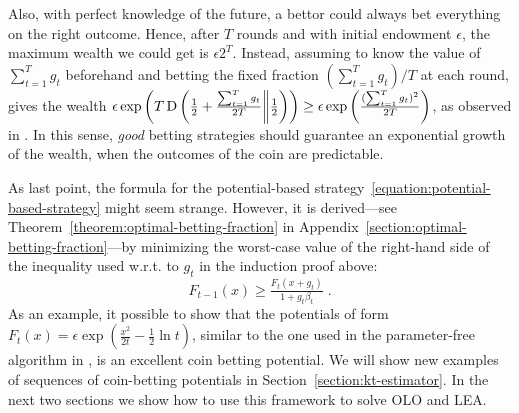 Also, with perfect knowledge of the future, a bettor could always bet everything on the right outcome. Hence, after $T$ rounds and with initial endowment $\epsilon$, the maximum wealth we could get is $\epsilon 2^T$. 
Instead, assuming to know the value of $\sum_{t=1}^T g_t$ beforehand and betting the fixed fraction $(\sum_{t=1}^T g_t)/T$ at each round, gives the wealth 
$\epsilon \exp\left(T \operatorname*{D}\left({\tfrac{1}{2}+\tfrac{\sum_{t=1}^T g_t}{2 T}}\middle\|{\tfrac{1}{2}}\right)\right) \geq \epsilon \exp\left(\tfrac{(\sum_{t=1}^T g_t)^2}{2 T}\right)$, as observed in \cite{McMahan-Abernethy-2013}.
In this sense, \emph{good} betting strategies should guarantee an exponential growth of the wealth, when the outcomes of the coin are predictable.

As last point, the formula for the potential-based
strategy~\eqref{equation:potential-based-strategy} might seem strange. However,
it is derived---see Theorem~\ref{theorem:optimal-betting-fraction} in
Appendix~\ref{section:optimal-betting-fraction}---by minimizing the worst-case value of the right-hand side of the
inequality used w.r.t. to $g_t$ in the induction proof above:
\[
F_{t-1}(x) \ge \tfrac{F_{t}(x + g_t)}{1+g_t\beta_t} \; .
\]
As an example, it possible to show that the potentials of form $F_t(x)=\epsilon \exp
\left(\tfrac{x^2}{2t}-\tfrac{1}{2} \ln t\right)$, similar to the one used in the parameter-free algorithm in \cite{McMahan-Orabona-2014}, is an excellent coin betting potential.
We will show new examples of sequences of coin-betting potentials in
Section~\ref{section:kt-estimator}. In the next two sections we show how to use
this framework to solve \ac{OLO} and \ac{LEA}.
